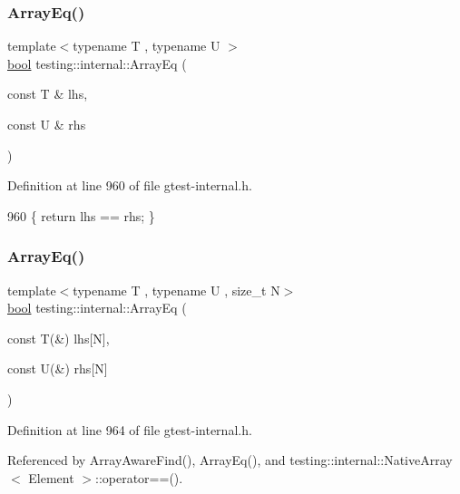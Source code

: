 \subsubsection{\texorpdfstring{Array\+Eq()}{ArrayEq()}\hspace{0.1cm}{\footnotesize\ttfamily [2/3]}}
{\footnotesize\ttfamily template$<$typename T , typename U $>$ \\
\hyperlink{classbool}{bool} testing\+::internal\+::\+Array\+Eq (\begin{DoxyParamCaption}\item[{const T \&}]{lhs,  }\item[{const U \&}]{rhs }\end{DoxyParamCaption})\hspace{0.3cm}{\ttfamily [inline]}}



Definition at line 960 of file gtest-\/internal.\+h.


\begin{DoxyCode}
960 \{ \textcolor{keywordflow}{return} lhs == rhs; \}
\end{DoxyCode}
\mbox{\label{namespacetesting_1_1internal_a5cb6f81ee827130024261121c742b26c}} 
\subsubsection{\texorpdfstring{Array\+Eq()}{ArrayEq()}\hspace{0.1cm}{\footnotesize\ttfamily [3/3]}}
{\footnotesize\ttfamily template$<$typename T , typename U , size\+\_\+t N$>$ \\
\hyperlink{classbool}{bool} testing\+::internal\+::\+Array\+Eq (\begin{DoxyParamCaption}\item[{const T(\&)}]{lhs\mbox{[}\+N\mbox{]},  }\item[{const U(\&)}]{rhs\mbox{[}\+N\mbox{]} }\end{DoxyParamCaption})\hspace{0.3cm}{\ttfamily [inline]}}



Definition at line 964 of file gtest-\/internal.\+h.



Referenced by Array\+Aware\+Find(), Array\+Eq(), and testing\+::internal\+::\+Native\+Array$<$ Element $>$\+::operator==().


